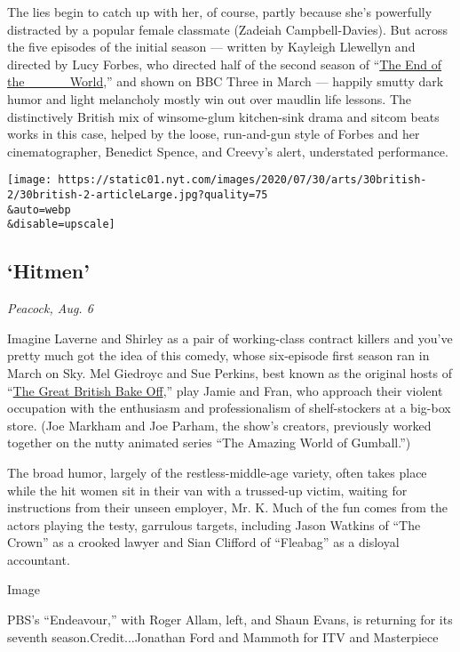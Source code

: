 The lies begin to catch up with her, of course, partly because she's
powerfully distracted by a popular female classmate (Zadeiah
Campbell-Davies). But across the five episodes of the initial season ---
written by Kayleigh Llewellyn and directed by Lucy Forbes, who directed
half of the second season of
``\href{https://www.nytimes.com/2019/11/04/arts/television/review-the-end-of-the-world-netflix.html}{The
End of the \_\_\_\_ World},'' and shown on BBC Three in March ---
happily smutty dark humor and light melancholy mostly win out over
maudlin life lessons. The distinctively British mix of winsome-glum
kitchen-sink drama and sitcom beats works in this case, helped by the
loose, run-and-gun style of Forbes and her cinematographer, Benedict
Spence, and Creevy's alert, understated performance.

\texttt{[image: https://static01.nyt.com/images/2020/07/30/arts/30british-2/30british-2-articleLarge.jpg?quality=75\\\&auto=webp\\\&disable=upscale]}

\hypertarget{hitmen}{%
\subsection{`Hitmen'}\label{hitmen}}

\emph{Peacock, Aug. 6}

Imagine Laverne and Shirley as a pair of working-class contract killers
and you've pretty much got the idea of this comedy, whose six-episode
first season ran in March on Sky. Mel Giedroyc and Sue Perkins, best
known as the original hosts of
``\href{https://www.nytimes.com/2016/09/14/business/media/great-british-bake-off-will-leave-bbc-for-rival.html}{The
Great British Bake Off},'' play Jamie and Fran, who approach their
violent occupation with the enthusiasm and professionalism of
shelf-stockers at a big-box store. (Joe Markham and Joe Parham, the
show's creators, previously worked together on the nutty animated series
``The Amazing World of Gumball.'')

The broad humor, largely of the restless-middle-age variety, often takes
place while the hit women sit in their van with a trussed-up victim,
waiting for instructions from their unseen employer, Mr. K. Much of the
fun comes from the actors playing the testy, garrulous targets,
including Jason Watkins of ``The Crown'' as a crooked lawyer and Sian
Clifford of ``Fleabag'' as a disloyal accountant.

Image

PBS's ``Endeavour,'' with Roger Allam, left, and Shaun Evans, is
returning for its seventh season.Credit...Jonathan Ford and Mammoth for
ITV and Masterpiece

